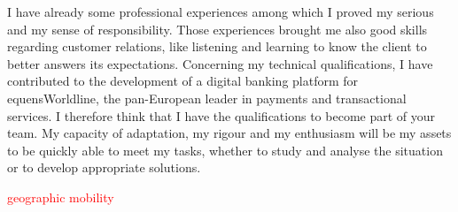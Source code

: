 \documentclass[11pt, a4paper]{awesome-cv}
\begin{document}
\begin{cvletter}
\vspace{2mm} 

I have already some professional experiences among which I proved my serious and my sense of responsibility. Those experiences brought me also good skills regarding customer relations, like listening and learning to know the client to better answers its expectations. Concerning my technical qualifications, I have contributed to the development of a digital banking platform for equensWorldline, the pan-European leader in payments and transactional services. \newline
I therefore think that I have the qualifications to become part of your team. My capacity of adaptation, my rigour and my enthusiasm will be my assets to be quickly able to meet my tasks, whether to study and analyse the situation or to develop appropriate solutions. 

\textcolor{red}{geographic mobility} 



\end{cvletter}


\makeletterclosing
\end{document}

